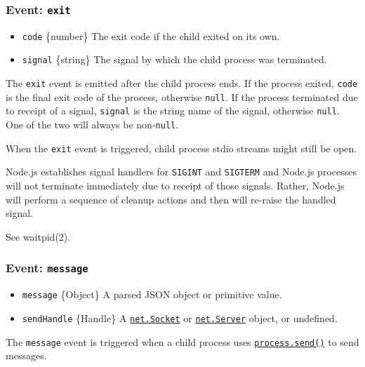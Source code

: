 \subsubsection{\texorpdfstring{Event:
\texttt{\textquotesingle{}exit\textquotesingle{}}}{Event: \textquotesingle exit\textquotesingle{}}}\label{event-exit}

\begin{itemize}
\tightlist
\item
  \texttt{code} \{number\} The exit code if the child exited on its own.
\item
  \texttt{signal} \{string\} The signal by which the child process was
  terminated.
\end{itemize}

The \texttt{\textquotesingle{}exit\textquotesingle{}} event is emitted
after the child process ends. If the process exited, \texttt{code} is
the final exit code of the process, otherwise \texttt{null}. If the
process terminated due to receipt of a signal, \texttt{signal} is the
string name of the signal, otherwise \texttt{null}. One of the two will
always be non-\texttt{null}.

When the \texttt{\textquotesingle{}exit\textquotesingle{}} event is
triggered, child process stdio streams might still be open.

Node.js establishes signal handlers for \texttt{SIGINT} and
\texttt{SIGTERM} and Node.js processes will not terminate immediately
due to receipt of those signals. Rather, Node.js will perform a sequence
of cleanup actions and then will re-raise the handled signal.

See waitpid(2).

\subsubsection{\texorpdfstring{Event:
\texttt{\textquotesingle{}message\textquotesingle{}}}{Event: \textquotesingle message\textquotesingle{}}}\label{event-message}

\begin{itemize}
\tightlist
\item
  \texttt{message} \{Object\} A parsed JSON object or primitive value.
\item
  \texttt{sendHandle} \{Handle\} A
  \href{net.md\#class-netsocket}{\texttt{net.Socket}} or
  \href{net.md\#class-netserver}{\texttt{net.Server}} object, or
  undefined.
\end{itemize}

The \texttt{\textquotesingle{}message\textquotesingle{}} event is
triggered when a child process uses
\href{process.md\#processsendmessage-sendhandle-options-callback}{\texttt{process.send()}}
to send messages.

